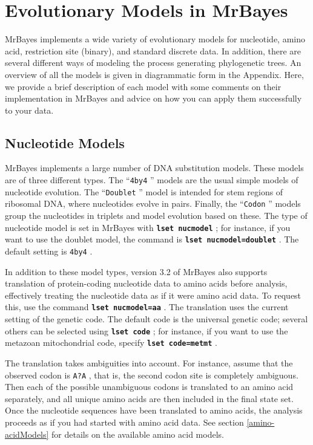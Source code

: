 \documentclass[12pt]{book}
\newcommand{\ttt}[1]{\texttt{#1} }
\newcommand{\tb}[1]{\ttt{\textbf{#1}} }
\begin{document}
\chapter{Evolutionary Models in MrBayes}
\label{evolutionaryModels}

MrBayes implements a wide variety of evolutionary models for nucleotide, amino acid, restriction
site (binary), and standard discrete data. In addition, there are several different ways of
modeling the process generating phylogenetic trees. An overview of all the models is given in
diagrammatic form in the Appendix. Here, we provide a brief description of each model with some
comments on their implementation in MrBayes and advice on how you can apply them successfully to
your data.

\section{Nucleotide Models}
MrBayes implements a large number of DNA substitution models. These models are of three different
types. The ``\ttt{4by4}'' models are the usual simple models of nucleotide evolution. The
``\ttt{Doublet}'' model is intended for stem regions of ribosomal DNA, where nucleotides evolve in
pairs. Finally, the ``\ttt{Codon}'' models group the nucleotides in triplets and model evolution
based on these. The type of nucleotide model is set in MrBayes with \tb{lset nucmodel}; for
instance, if you want to use the doublet model, the command is \tb{lset nucmodel=doublet}. The
default setting is \ttt{4by4}.

In addition to these model types, version 3.2 of MrBayes also supports translation of
protein-coding nucleotide data to amino acids before analysis, effectively treating the nucleotide
data as if it were amino acid data. To request this, use the command \tb{lset nucmodel=aa}. The
translation uses the current setting of the genetic code. The default code is the universal genetic
code; several others can be selected using \tb{lset code}; for instance, if you want to use the
metazoan mitochondrial code, specify \tb{lset code=metmt}.

The translation takes ambiguities into account. For instance, assume that the observed codon is
\ttt{A?A}, that is, the second codon site is completely ambiguous. Then each of the possible
unambiguous codons is translated to an amino acid separately, and all unique amino acids are then
included in the final state set. Once the nucleotide sequences have been translated to amino acids,
the analysis proceeds as if you had started with amino acid data.  See section
\ref{amino-acidModels} for details on the available amino acid models.
\end{document}
